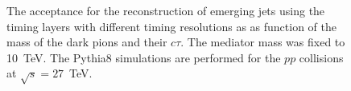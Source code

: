 \begin{figure}
\begin{center}

\end{center}
\caption{
The acceptance for the reconstruction of emerging jets using the timing layers with different timing resolutions as
as function of the mass of the dark pions and their $c\tau$. The mediator mass was fixed to 10~TeV. The Pythia8 simulations are performed 
for the $pp$ collisions at $\sqrt{s}=27$~TeV. 
}
\label{fig:efficiency}
\end{figure}

